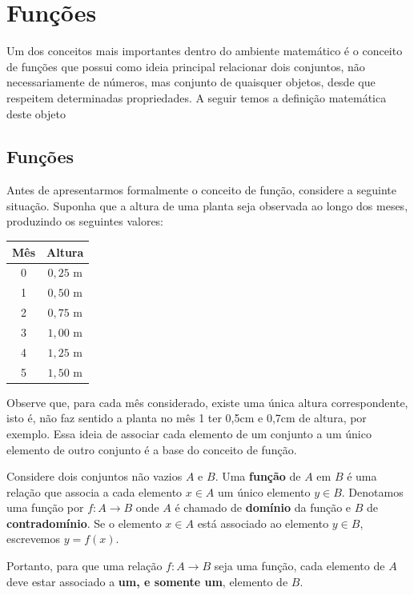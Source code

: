\chapter{Funções}

\inic Um dos conceitos mais importantes dentro do ambiente matemático é o conceito de funções que possui como ideia principal relacionar dois conjuntos, não necessariamente de números, mas conjunto de quaisquer objetos, desde que respeitem determinadas propriedades. A seguir temos a definição matemática deste objeto 

\section{Funções}

Antes de apresentarmos formalmente o conceito de função, considere a seguinte situação. Suponha que a altura de uma planta seja observada ao longo dos meses, produzindo os seguintes valores:

\begin{center}
    \begin{tabular}{c|c}
        \hline
        Mês & Altura \\
        \hline
        0 & $0{,}25$ m \\
        1 & $0{,}50$ m \\
        2 & $0{,}75$ m \\
        3 & $1{,}00$ m \\
        4 & $1{,}25$ m \\
        5 & $1{,}50$ m \\
        \hline
    \end{tabular}
\end{center}

Observe que, para cada mês considerado, existe uma única altura correspondente, isto é, não faz sentido a planta no mês 1 ter 0,5cm e 0,7cm de altura, por exemplo. Essa ideia de associar cada elemento de um conjunto a um único elemento de outro conjunto é a base do conceito de função.



\begin{defin}
    Considere dois conjuntos não vazios $A$ e $B$. Uma \textbf{função} de $A$ em $B$ é uma relação que associa a cada elemento $x\in A$ um único elemento $y\in B$. Denotamos uma função por $f:A\longrightarrow B$ onde $A$ é chamado de \textbf{domínio} da função e $B$ de \textbf{contradomínio}. Se o elemento $x\in A$ está associado ao elemento $y\in B$, escrevemos $y=f(x)$.
\end{defin}
Portanto, para que uma relação $f:A\to B$ seja uma função, cada elemento de $A$ deve estar associado a \textbf{um, e somente um}, elemento de $B$.

